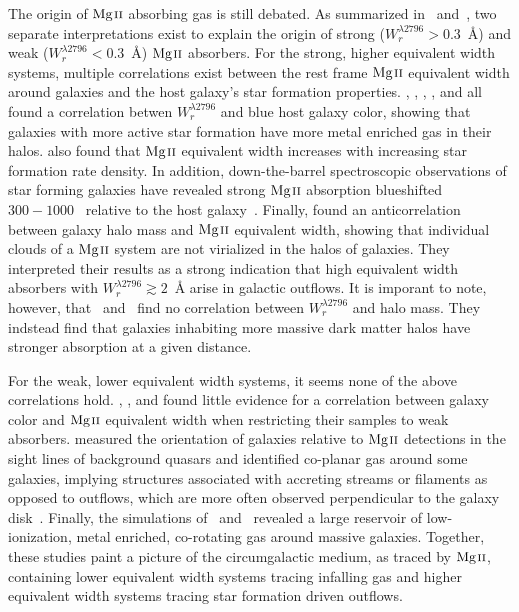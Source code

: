 \documentclass[iop,apj,numberedappendix,appendixfloats,twocolappendix]{emulateapj}
\begin{document}
The origin of ${\hbox{{\rm Mg}\kern 0.1em{\sc ii}}}$ absorbing gas is still debated. As summarized in~\cite{Kacprzak2011} and~\cite{Matejek2013}, two separate interpretations exist to explain the origin of strong ($W_r^{\lambda2796} > 0.3$~{\AA}) and weak ($W_r^{\lambda2796} < 0.3$~{\AA}) ${\hbox{{\rm Mg}\kern 0.1em{\sc ii}}}$ absorbers. For the strong, higher equivalent width systems, multiple correlations exist between the rest frame ${\hbox{{\rm Mg}\kern 0.1em{\sc ii}}}$ equivalent width around galaxies and the host galaxy's star formation properties. \cite{Zibetti2007}, \cite{Lundgren2009}, \cite{Noterdaeme2010}, \cite{Bordoloi2011}, and \cite{Nestor2011} all found a correlation betwen $W_r^{\lambda2796}$ and blue host galaxy color, showing that galaxies with more active star formation have more metal enriched gas in their halos. \cite{Bordoloi2014} also found that ${\hbox{{\rm Mg}\kern 0.1em{\sc ii}}}$ equivalent width increases with increasing star formation rate density. In addition, down-the-barrel spectroscopic observations of star forming galaxies have revealed strong ${\hbox{{\rm Mg}\kern 0.1em{\sc ii}}}$ absorption blueshifted $300 - 1000$~{\kms} relative to the host galaxy~\citep{Tremonti2007,Weiner2009,Martin2009,Rubin2010}. Finally, \cite{Bouche2006} found an anticorrelation between galaxy halo mass and ${\hbox{{\rm Mg}\kern 0.1em{\sc ii}}}$ equivalent width, showing that individual clouds of a ${\hbox{{\rm Mg}\kern 0.1em{\sc ii}}}$ system are not virialized in the halos of galaxies. They interpreted their results as a strong indication that high equivalent width absorbers with $W_r^{\lambda2796} \gtrsim 2$~{\AA} arise in galactic outflows. It is imporant to note, however, that~\cite{Churchill2013letter} and~\cite{MAGIICAT3} find no correlation between $W_r^{\lambda2796}$ and halo mass. They indstead find that galaxies inhabiting more massive dark matter halos have stronger absorption at a given distance.

For the weak, lower equivalent width systems, it seems none of the above correlations hold. \cite{Chen2010b}, \cite{Kacprzak2011}, and \cite{Lovegrove2011} found little evidence for a correlation between galaxy color and ${\hbox{{\rm Mg}\kern 0.1em{\sc ii}}}$ equivalent width when restricting their samples to weak absorbers. \cite{Kacprzak2011} measured the orientation of galaxies relative to ${\hbox{{\rm Mg}\kern 0.1em{\sc ii}}}$ detections in the sight lines of background quasars and identified co-planar gas around some galaxies, implying structures associated with accreting streams or filaments as opposed to outflows, which are more often observed perpendicular to the galaxy disk~\citep{Bordoloi2011,Kacprzak2012-PA}. Finally, the simulations of~\cite{Stewart2011} and~\cite{Ford2013mass} revealed a large reservoir of low-ionization, metal enriched, co-rotating gas around massive galaxies. Together, these studies paint a picture of the circumgalactic medium, as traced by ${\hbox{{\rm Mg}\kern 0.1em{\sc ii}}}$, containing lower equivalent width systems tracing infalling gas and higher equivalent width systems tracing star formation driven outflows.
\end{document}
